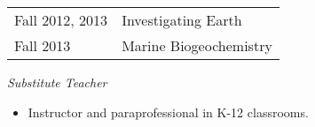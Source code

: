 \begin{tabular}{l l} %
Fall 2012, 2013 & Investigating Earth\\Fall 2013 & Marine Biogeochemistry
\end{tabular}

\textit{Substitute Teacher}
\begin{itemize}
	\item Instructor and paraprofessional in K-12 classrooms.
\end{itemize}